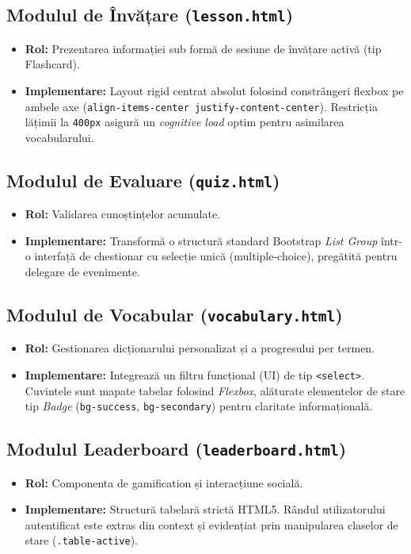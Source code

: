 \documentclass[11pt, a4paper]{article}
\begin{document}
\subsection{Modulul de Învățare (\texttt{lesson.html})}
\begin{itemize}[label={}]
    \item \textbf{Rol:} Prezentarea informației sub formă de sesiune de învățare activă (tip Flashcard).
    \item \textbf{Implementare:} Layout rigid centrat absolut folosind constrângeri flexbox pe ambele axe (\texttt{align-items-center justify-content-center}). Restricția lățimii la \texttt{400px} asigură un \textit{cognitive load} optim pentru asimilarea vocabularului.
\end{itemize}

\subsection{Modulul de Evaluare (\texttt{quiz.html})}
\begin{itemize}[label={}]
    \item \textbf{Rol:} Validarea cunoștințelor acumulate.
    \item \textbf{Implementare:} Transformă o structură standard Bootstrap \textit{List Group} într-o interfață de chestionar cu selecție unică (multiple-choice), pregătită pentru delegare de evenimente.
\end{itemize}

\subsection{Modulul de Vocabular (\texttt{vocabulary.html})}
\begin{itemize}[label={}]
    \item \textbf{Rol:} Gestionarea dicționarului personalizat și a progresului per termen.
    \item \textbf{Implementare:} Integrează un filtru funcțional (UI) de tip \texttt{<select>}. Cuvintele sunt mapate tabelar folosind \textit{Flexbox}, alăturate elementelor de stare tip \textit{Badge} (\texttt{bg-success}, \texttt{bg-secondary}) pentru claritate informațională.
\end{itemize}

\subsection{Modulul Leaderboard (\texttt{leaderboard.html})}
\begin{itemize}[label={}]
    \item \textbf{Rol:} Componenta de gamification și interacțiune socială.
    \item \textbf{Implementare:} Structură tabelară strictă HTML5. Rândul utilizatorului autentificat este extras din context și evidențiat prin manipularea claselor de stare (\texttt{.table-active}).
\end{itemize}
\end{document}
